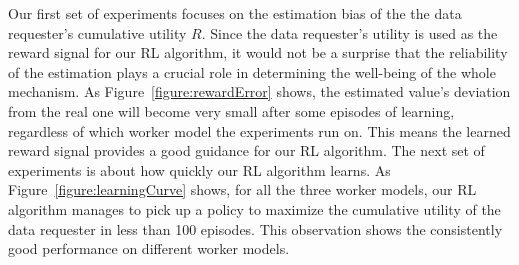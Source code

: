 %

Our first set of experiments focuses on the estimation bias of the the data requester's cumulative utility $R$.
Since the data requester's utility is used as the reward signal for our RL algorithm, it would not be a surprise that the reliability of the estimation plays a crucial role in determining the well-being of the whole mechanism. As Figure~\ref{figure:rewardError} shows, the estimated value's deviation from the real one will become very small after some episodes of learning, regardless of which worker model the experiments run on.
This means the learned reward signal provides a good guidance for our RL algorithm.
The next set of experiments is about how quickly our RL algorithm learns. As Figure~\ref{figure:learningCurve} shows, for all the three worker models, our RL algorithm manages to pick up a policy to maximize the cumulative utility of the data requester in less than 100 episodes. 
This observation shows the consistently good performance on different worker models.

